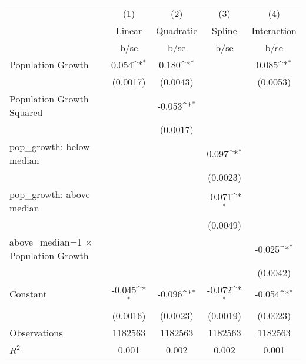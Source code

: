 {
\def\sym#1{\ifmmode^{#1}\else\(^{#1}\)\fi}
\begin{tabular}{l*{4}{c}}
\toprule
                    &\multicolumn{1}{c}{(1)}&\multicolumn{1}{c}{(2)}&\multicolumn{1}{c}{(3)}&\multicolumn{1}{c}{(4)}\\
                    &\multicolumn{1}{c}{Linear}&\multicolumn{1}{c}{Quadratic}&\multicolumn{1}{c}{Spline}&\multicolumn{1}{c}{Interaction}\\
                    &        b/se       &        b/se       &        b/se       &        b/se       \\
\midrule
Population Growth   &       0.054\sym{*}&       0.180\sym{*}&                   &       0.085\sym{*}\\
                    &    (0.0017)       &    (0.0043)       &                   &    (0.0053)       \\
Population Growth Squared&                   &      -0.053\sym{*}&                   &                   \\
                    &                   &    (0.0017)       &                   &                   \\
pop\_growth: below median&                   &                   &       0.097\sym{*}&                   \\
                    &                   &                   &    (0.0023)       &                   \\
pop\_growth: above median&                   &                   &      -0.071\sym{*}&                   \\
                    &                   &                   &    (0.0049)       &                   \\
above\_median=1 $\times$ Population Growth&                   &                   &                   &      -0.025\sym{*}\\
                    &                   &                   &                   &    (0.0042)       \\
Constant            &      -0.045\sym{*}&      -0.096\sym{*}&      -0.072\sym{*}&      -0.054\sym{*}\\
                    &    (0.0016)       &    (0.0023)       &    (0.0019)       &    (0.0023)       \\
\midrule
Observations        &     1182563       &     1182563       &     1182563       &     1182563       \\
\(R^{2}\)           &       0.001       &       0.002       &       0.002       &       0.001       \\
\bottomrule
\end{tabular}
}

